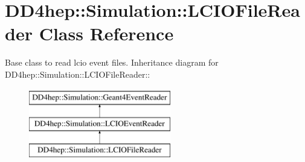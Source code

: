 \hypertarget{class_d_d4hep_1_1_simulation_1_1_l_c_i_o_file_reader}{
\section{DD4hep::Simulation::LCIOFileReader Class Reference}
\label{class_d_d4hep_1_1_simulation_1_1_l_c_i_o_file_reader}
}


Base class to read lcio event files.  
Inheritance diagram for DD4hep::Simulation::LCIOFileReader::\begin{figure}[H]
\begin{center}
\leavevmode
\includegraphics[height=3cm]{class_d_d4hep_1_1_simulation_1_1_l_c_i_o_file_reader}
\end{center}
\end{figure}

